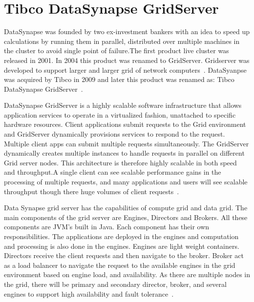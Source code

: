 \section{Tibco DataSynapse GridServer}

DataSynapse was founded by two ex-investment 
bankers with an idea to speed up calculations
by running them in parallel, distributed over
multiple machines in the cluster to avoid 
single point of failure.The first product live 
cluster was released in 2001. 
In 2004 this product was renamed 
to GridServer. Gridserver was
developed to support larger and 
larger grid of network 
computers~\cite{hid-sp18-514-datasynapsewiki}. 
DataSyanpse was acquired by Tibco in 2009 and 
later this product was renamed as: 
Tibco DataSynapse 
GridServer~\cite{hid-sp18-514-tibcodatasynapsewiki}.

DataSynapse GridServer is a highly scalable
software infrastructure that allows
application services to operate 
in a virtualized fashion, unattached
to specific hardware resources. 
Client applications submit requests to
the Grid environment and 
GridServer dynamically provisions services to
respond to the request. 
Multiple client apps can submit
multiple requests simultaneously.
The GridServer dynamically creates
multiple instances to 
handle requests in parallel 
on different Grid server nodes. 
This architecture is 
therefore highly scalable in both
speed and throughput.A single client 
can see scalable performance gains 
in the processing of multiple requests, 
and many applications and users will see 
scalable throughput though 
there huge volumes of client 
requests~\cite{hid-sp18-514-tibcods}.

Data Synapse grid server has the
capabilities of compute grid and data grid. 
The main components of the
grid server are Engines, Directors and Brokers. 
All these components are JVM's built in Java. 
Each component has their own responsibilities. 
The applications are deployed in the engines and
computation and processing is also done in 
the engines. Engines are light weight containers. 
Directors receive the client requests and
then navigate to the broker. Broker act as 
a load balancer to navigate the request to 
the available engines in the grid environment
based on engine load, and availability. 
As there are multiple nodes in the grid, 
there will be primary and secondary director, 
broker, and several engines to support 
high availability and 
fault tolerance~\cite{hid-sp18-514-tibcods}.
